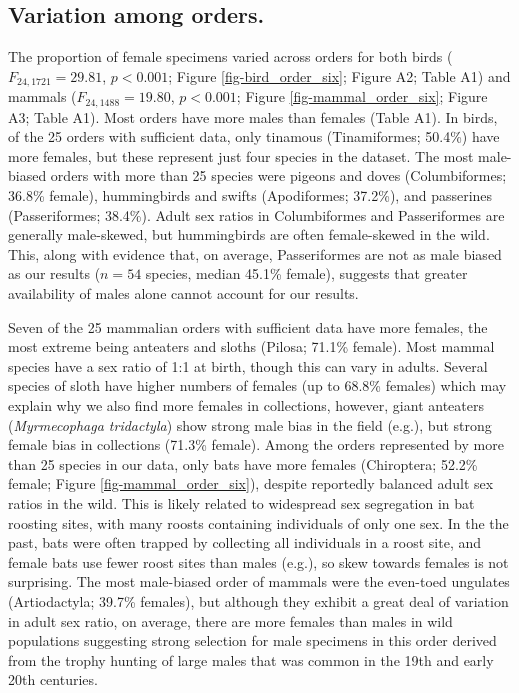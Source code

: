 \documentclass[a4paper, 12pt]{article}
\begin{document}
\subsection{Variation among orders.} 
The proportion of female specimens varied across orders for both birds ($F_{24, 1721} = 29.81$, $p < 0.001$; Figure \ref{fig-bird_order_six}; Figure A2; Table A1) and mammals ($F_{24, 1488} = 19.80$, $p < 0.001$; Figure \ref{fig-mammal_order_six}; Figure A3; Table A1). Most orders have more males than females (Table A1). 
In birds, of the 25 orders with sufficient data, only tinamous (Tinamiformes; 50.4\%) have more females, but these represent just four species in the dataset. 
The most male-biased orders with more than 25 species were pigeons and doves (Columbiformes; 36.8\% female), hummingbirds and swifts (Apodiformes; 37.2\%), and passerines (Passeriformes; 38.4\%). 
Adult sex ratios in Columbiformes and Passeriformes are generally male-skewed\cite{szekely2014sex,bosque2019skewed,mayr1939sex}, but hummingbirds are often female-skewed in the wild\cite{szekely2014sex,mayr1939sex}. 
This, along with evidence that, on average, Passeriformes are not as male biased as our results ($n = 54$ species, median 45.1\% female\cite{szekely2014sex}), suggests that greater availability of males alone cannot account for our results.

Seven of the 25 mammalian orders with sufficient data have more females, the most extreme being anteaters and sloths (Pilosa; 71.1\% female). 
Most mammal species have a sex ratio of 1:1 at birth\cite{karlin1986theoretical}, though this can vary in adults. 
Several species of sloth have higher numbers of females (up to 68.8\% females\cite{reyes2015informacion}) which may explain why we also find more females in collections, however, giant anteaters (\textit{Myrmecophaga tridactyla}) show strong male bias in the field (e.g.\cite{defreitas2015}), but strong female bias in collections (71.3\% female). 
Among the orders represented by more than 25 species in our data, only bats have more females (Chiroptera; 52.2\% female; Figure \ref{fig-mammal_order_six}), despite reportedly balanced adult sex ratios in the wild\cite{altringham}. 
This is likely related to widespread sex segregation in bat roosting sites, with many roosts containing individuals of only one sex\cite{altringham}. 
In the the past, bats were often trapped by collecting all individuals in a roost site, and female bats use fewer roost sites than males (e.g.\cite{encarnaccao2012spatiotemporal}), so skew towards females is not surprising. 
The most male-biased order of mammals were the even-toed ungulates (Artiodactyla; 39.7\% females), but although they exhibit a great deal of variation in adult sex ratio, on average, there are more females than males in wild populations\cite{berger1999sex} suggesting strong selection for male specimens in this order derived from the trophy hunting of large males that was common in the 19th and early 20th centuries.
\end{document}

